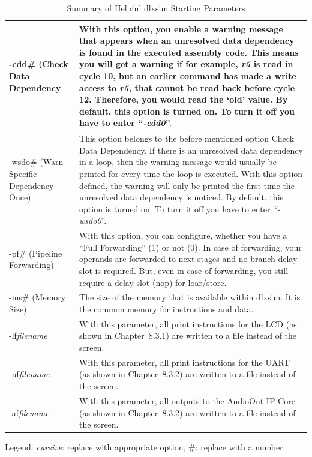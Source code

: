 \begin{table}[!htb]
\begin{tabular}{|p{3cm}|p{13cm}|}
		-cdd\# (Check Data Dependency & 
		With this option, you enable a warning message that appears when an
		unresolved data dependency is found in the executed assembly code. This
		means you will get a warning if for example, \emph{r5} is read in cycle
		10, but an earlier command has made a write access to \emph{r5}, that
		cannot be read back before cycle 12. Therefore, you would read the `old'
		value. By default, this option is turned on. To turn it off you have to
		enter ``\emph{-cdd0}''.\\\hline
		-wsdo\# (Warn Specific Dependency Once) & 
		This option belongs to the before mentioned option Check Data
		Dependency. If there is an unresolved data dependency in a loop, then
		the warning message would usually be printed for every time the loop is
		executed. With this option defined, the warning will only be printed the
		first time the unresolved data dependency is noticed. By default, this
		option is turned on. To turn it off you have to enter
		\emph{``-wsdo0}''.\\\hline
		-pf\# (Pipeline Forwarding) & 
		With this option, you can configure, whether you have a ``Full
		Forwarding'' (1) or not (0). In case of forwarding, your operands are
		forwarded to next stages and no branch delay slot is required. But, even
		in case of forwarding, you still require a delay slot (nop) for
		loar/store.\\\hline
		-ms\# (Memory Size) & 
		The size of the memory that is available within dlxsim. It is the common
		memory for instructions and data.\\\hline
		-lf\emph{filename} & With this parameter, all print instructions for the
		LCD (as shown in Chapter~8.3.1) are written to a file instead of the
		screen.\\\hline
		-uf\emph{filename} & With this parameter, all print instructions for the
		UART (as shown in Chapter~8.3.2) are written to a file instead of the
		screen.\\\hline
		-af\emph{filename} & With this parameter, all outputs to the AudioOut
		IP-Core (as shown in Chapter~8.3.2) are written to a file instead of the
		screen.\\\hline
	\end{tabular}
	\caption{Summary of Helpful dlxsim Starting Parameters}
	\label{fig:fig35}
\end{table}
Legend: \emph{cursive}: replace with appropriate option, \#: replace
with a number

